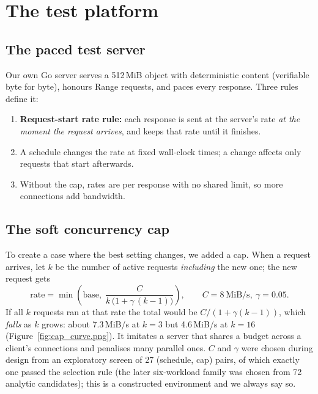 \section{The test platform}
\subsection{The paced test server}
Our own Go server serves a 512\,MiB object with deterministic content (verifiable byte for byte), honours Range requests, and paces every response. Three rules define it:
\begin{enumerate}
\item \textbf{Request-start rate rule:} each response is sent at the server's rate \emph{at the moment the request arrives}, and keeps that rate until it finishes.
\item A schedule changes the rate at fixed wall-clock times; a change affects only requests that start afterwards.
\item Without the cap, rates are per response with no shared limit, so more connections add bandwidth.
\end{enumerate}

\subsection{The soft concurrency cap}
To create a case where the best setting changes, we added a cap. When a request arrives, let $k$ be the number of active requests \emph{including} the new one; the new request gets
\begin{equation}\label{eq:cap}
\text{rate} = \min\!\left(\text{base},\; \frac{C}{k\,\bigl(1+\gamma\,(k-1)\bigr)}\right),\qquad C = 8~\text{MiB/s},\ \gamma = 0.05 .
\end{equation}
If all $k$ requests ran at that rate the total would be $C/(1+\gamma(k-1))$, which \emph{falls} as $k$ grows: about 7.3\,MiB/s at $k=3$ but 4.6\,MiB/s at $k=16$ (Figure~\ref{fig:cap_curve.png}). It imitates a server that shares a budget across a client's connections and penalises many parallel ones. $C$ and $\gamma$ were chosen during design from an exploratory screen of 27 (schedule, cap) pairs, of which exactly one passed the selection rule (the later six-workload family was chosen from 72 analytic candidates); this is a constructed environment and we always say so.

